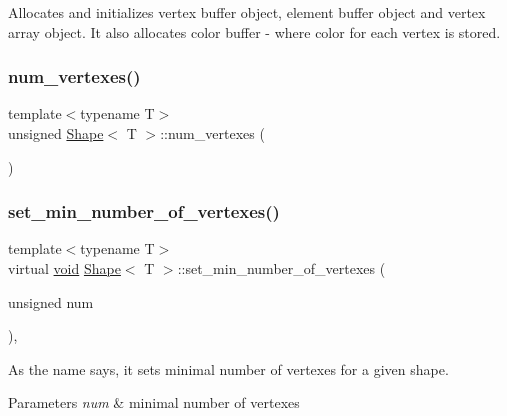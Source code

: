 Allocates and initializes vertex buffer object, element buffer object and vertex array object. It also allocates color buffer -\/ where color for each vertex is stored. 

\mbox{\label{classShape_a131e85c7f5cad85bffb92e6719117cab}} 
\subsubsection{\texorpdfstring{num\+\_\+vertexes()}{num\_vertexes()}}
{\footnotesize\ttfamily template$<$typename T$>$ \\
unsigned \mbox{\hyperlink{classShape}{Shape}}$<$ T $>$\+::num\+\_\+vertexes (\begin{DoxyParamCaption}{ }\end{DoxyParamCaption})\hspace{0.3cm}{\ttfamily [inline]}}

\mbox{\label{classShape_ac5a35fe1b2ecb8fcfc050a31c8969805}} 
\subsubsection{\texorpdfstring{set\+\_\+min\+\_\+number\+\_\+of\+\_\+vertexes()}{set\_min\_number\_of\_vertexes()}}
{\footnotesize\ttfamily template$<$typename T$>$ \\
virtual \mbox{\hyperlink{glad_8h_a950fc91edb4504f62f1c577bf4727c29}{void}} \mbox{\hyperlink{classShape}{Shape}}$<$ T $>$\+::set\+\_\+min\+\_\+number\+\_\+of\+\_\+vertexes (\begin{DoxyParamCaption}\item[{unsigned}]{num }\end{DoxyParamCaption})\hspace{0.3cm}{\ttfamily [inline]}, {\ttfamily [virtual]}}



As the name says, it sets minimal number of vertexes for a given shape. 


\begin{DoxyParams}{Parameters}
{\em num} & minimal number of vertexes \\
\hline
\end{DoxyParams}
\mbox{\label{classShape_a69dabd50440dba1ac463ad6819cdb506}} 
